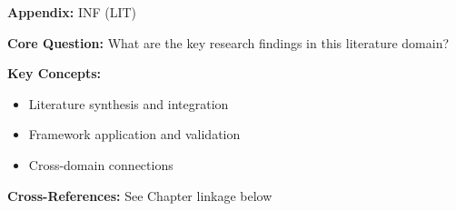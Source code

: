 
\begin{tcolorbox}[colback=blue!5!white, colframe=blue!75!black,
    title=Quick Reference: Appendix INF]
\textbf{Appendix:} INF (LIT)

\textbf{Core Question:} What are the key research findings in this literature domain?

\textbf{Key Concepts:}
\begin{itemize}[nosep]
\item Literature synthesis and integration
\item Framework application and validation
\item Cross-domain connections
\end{itemize}

\textbf{Cross-References:} See Chapter linkage below
\end{tcolorbox}


\begin{abstract}
This appendix provides a systematic review and integration of key research findings
in the LIT domain. It synthesizes literature relevant to the Evidence-Based
Framework (EBF) and identifies connections to the 10C CORE architecture.
\end{abstract}


